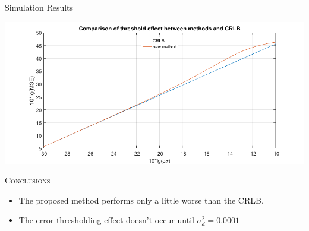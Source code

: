\documentclass[10pt]{beamer}
\begin{document}
\begin{frame}{Simulation Results}
  \begin{center}
  \includegraphics[scale=0.35]{fig4.JPG}
  \end{center}
  \begin{center} \textsc{Conclusions} \end{center}
  \begin{itemize}
    \item \small The proposed method performs only a little worse than the CRLB.
    \item \small The error thresholding effect doesn't occur until $ \sigma_d^2 = 0.0001 $
  \end{itemize}
\end{frame}
 
\end{document}
